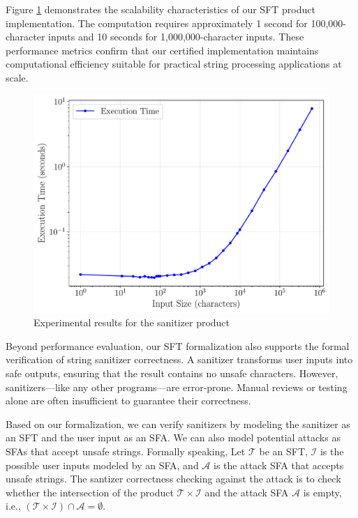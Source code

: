 Figure \ref{fig:benchmark-results} demonstrates the scalability characteristics of our SFT product implementation. The computation requires approximately 1 second for 100,000-character inputs and 10 seconds for 1,000,000-character inputs. These performance metrics confirm that our certified implementation maintains computational efficiency suitable for practical string processing applications at scale.

\begin{figure}
\centering
\includegraphics[scale=0.45]{benchmark_loglog.pdf}
\caption{Experimental results for the sanitizer product}
\label{fig:benchmark-results}
\end{figure}

Beyond performance evaluation, our SFT formalization also supports the formal verification of string sanitizer correctness. A sanitizer transforms user inputs into safe outputs, ensuring that the result contains no unsafe characters. However, sanitizers—like any other programs—are error-prone. Manual reviews or testing alone are often insufficient to guarantee their correctness.

Based on our formalization, we can verify sanitizers by modeling the sanitizer as an SFT and the user input as an SFA. We can also model potential attacks as SFAs that accept unsafe strings. Formally speaking, Let $\mathcal{T}$ be an SFT, $\mathcal{I}$ is the possible user inputs modeled by an SFA, and $\mathcal{A}$ is the attack SFA that accepts unsafe strings. The santizer correctness checking against the attack is to check whether the intersection of the product $\mathcal{T} \times \mathcal{I}$ and the attack SFA $\mathcal{A}$ is empty, i.e., $(\mathcal{T} \times \mathcal{I}) \cap \mathcal{A} = \emptyset$.

